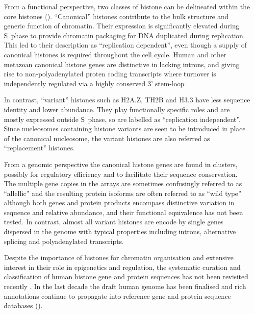   From a functional perspective, two classes of histone can be delineated within the core histones (). 
  ``Canonical'' histones contribute to the bulk structure and generic function of chromatin. 
  Their expression is significantly elevated during S~phase to provide chromatin packaging 
  for DNA duplicated during replication. This led to their description as ``replication dependent'', 
  even though a supply of canonical histones is required throughout the cell cycle. 
  Human and other metazoan canonical histone genes are distinctive in lacking introns, 
  and giving rise to non-polyadenylated proten coding transcripts 
  where turnover is independently regulated via a highly conserved 3' stem-loop
  
  In contrast, ``variant'' histones such as H2A.Z, TH2B and H3.3 have less sequence identity and lower abundance. 
  They play functionally specific roles and are mostly expressed outside S~phase, 
  so are labelled as ``replication independent''. 
  Since nucleosomes containing histone variants are seen to be introduced in place of the canonical nucleosome, 
  the variant histones are also referred as ``replacement'' histones.
  
  From a genomic perspective the canonical histone genes are found in  clusters, 
  possibly for regulatory efficiency and to facilitate their sequence conservation. 
  The multiple gene copies in the arrays are sometimes confusingly referred to as ``allellic'' 
  and the resulting protein isoforms are often referred to as ``wild type'' 
  although both genes and protein products encompass distinctive variation in sequence and relative abundance, 
  and their functional equivalence has not been tested.
  In contrast, almost all variant histones are encode by single genes dispersed in the genome 
  with typical properties including introns, alternative splicing and polyadenylated transcripts.
  
  Despite the importance of histones for chromatin organisation and extensive interest
  in their role in epigenetics and regulation, the systematic curation and classification of human histone
  gene and protein sequences has not been revisited recently \citep{Marzluff02}.
  In the last decade the draft human genome has been finalised 
  and rich annotations continue to propagate into reference gene and protein sequence databases ().


